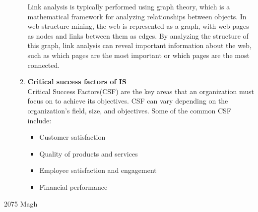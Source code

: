 \documentclass[12pt]{article}
\begin{document}
\begin{enumerate}
\begin{enumerate}
Link analysis is typically performed using graph theory, which is a mathematical framework for analyzing relationships between objects. In web structure mining, the web is represented as a graph, with web pages as nodes and links between them as edges. By analyzing the structure of this graph, link analysis can reveal important information about the web, such as which pages are the most important or which pages are the most connected.
    \item {\bfseries Critical success factors of IS\\}
    Critical Success Factors(CSF) are the key areas that an organization must focus on to achieve its objectives. CSF can vary depending on the organization's field, size, and objectives. Some of the common CSF include:
        \begin{itemize}
            \item Customer satisfaction
            \item Quality of products and services
            \item Employee satisfaction and engagement
            \item Financial performance
        \end{itemize}
    \end{enumerate}
    \end{enumerate}
    \pagebreak
{\Large 2075 Magh}
\end{document}
